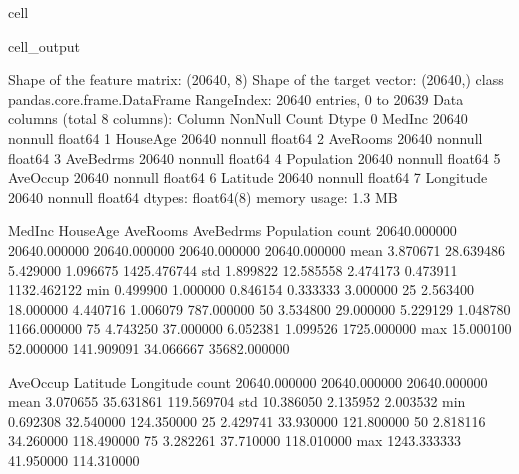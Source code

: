 \documentclass[letterpaper,10pt,english]{jupyterBook}
\begin{document}
\begin{sphinxuseclass}{cell}
\begin{sphinxVerbatimOutput}
\begin{sphinxuseclass}{cell_output}
\begin{sphinxVerbatim}[commandchars=\\\{\}]
Shape of the feature matrix: (20640, 8)
Shape of the target vector: (20640,)
\PYGZlt{}class \PYGZsq{}pandas.core.frame.DataFrame\PYGZsq{}\PYGZgt{}
RangeIndex: 20640 entries, 0 to 20639
Data columns (total 8 columns):
 \PYGZsh{}   Column      Non\PYGZhy{}Null Count  Dtype  
\PYGZhy{}\PYGZhy{}\PYGZhy{}  \PYGZhy{}\PYGZhy{}\PYGZhy{}\PYGZhy{}\PYGZhy{}\PYGZhy{}      \PYGZhy{}\PYGZhy{}\PYGZhy{}\PYGZhy{}\PYGZhy{}\PYGZhy{}\PYGZhy{}\PYGZhy{}\PYGZhy{}\PYGZhy{}\PYGZhy{}\PYGZhy{}\PYGZhy{}\PYGZhy{}  \PYGZhy{}\PYGZhy{}\PYGZhy{}\PYGZhy{}\PYGZhy{}  
 0   MedInc      20640 non\PYGZhy{}null  float64
 1   HouseAge    20640 non\PYGZhy{}null  float64
 2   AveRooms    20640 non\PYGZhy{}null  float64
 3   AveBedrms   20640 non\PYGZhy{}null  float64
 4   Population  20640 non\PYGZhy{}null  float64
 5   AveOccup    20640 non\PYGZhy{}null  float64
 6   Latitude    20640 non\PYGZhy{}null  float64
 7   Longitude   20640 non\PYGZhy{}null  float64
dtypes: float64(8)
memory usage: 1.3 MB
\end{sphinxVerbatim}

\begin{sphinxVerbatim}[commandchars=\\\{\}]
             MedInc      HouseAge      AveRooms     AveBedrms    Population  \PYGZbs{}
count  20640.000000  20640.000000  20640.000000  20640.000000  20640.000000   
mean       3.870671     28.639486      5.429000      1.096675   1425.476744   
std        1.899822     12.585558      2.474173      0.473911   1132.462122   
min        0.499900      1.000000      0.846154      0.333333      3.000000   
25\PYGZpc{}        2.563400     18.000000      4.440716      1.006079    787.000000   
50\PYGZpc{}        3.534800     29.000000      5.229129      1.048780   1166.000000   
75\PYGZpc{}        4.743250     37.000000      6.052381      1.099526   1725.000000   
max       15.000100     52.000000    141.909091     34.066667  35682.000000   

           AveOccup      Latitude     Longitude  
count  20640.000000  20640.000000  20640.000000  
mean       3.070655     35.631861   \PYGZhy{}119.569704  
std       10.386050      2.135952      2.003532  
min        0.692308     32.540000   \PYGZhy{}124.350000  
25\PYGZpc{}        2.429741     33.930000   \PYGZhy{}121.800000  
50\PYGZpc{}        2.818116     34.260000   \PYGZhy{}118.490000  
75\PYGZpc{}        3.282261     37.710000   \PYGZhy{}118.010000  
max     1243.333333     41.950000   \PYGZhy{}114.310000  
\end{sphinxVerbatim}

\end{sphinxuseclass}\end{sphinxVerbatimOutput}

\end{sphinxuseclass}
\end{document}
